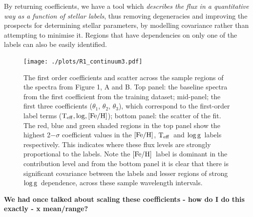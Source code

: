 \documentclass[12pt, preprint]{aastex}
\newcommand{\teff}{\mbox{$\rm T_{eff}$}}
\newcommand{\feh}{\mbox{$\rm [Fe/H]$}}
\newcommand{\logg}{\mbox{$\rm \log g$}}
\begin{document}

By returning coefficients, we have a tool which \textit{describes the flux in a quantitative way as a function of stellar labels}, thus removing degeneracies and improving the prospects for determining stellar parameters, by modelling covariance rather than attempting to minimise it. Regions that have dependencies on only one of the labels can also be easily identified. 

\begin{figure}[h!]
\centering
    \texttt{[image: ./plots/R1\_continuum3.pdf]}
  \caption{The first order coefficients and scatter across the sample regions of the spectra from Figure 1, A and B. Top panel: the baseline spectra from the first coefficient from the training dataset; mid-panel; the first three coefficients ($\theta_1$, $\theta_2$, $\theta_3$),  which correspond to the first-order label terms ($\teff, \log, \feh$); bottom panel: the scatter of the fit.  The red, blue and green shaded regions in the top panel show the highest 2$-\sigma$ coefficient values in the \feh, \teff\ and \logg\ labels respectively. This indicates where these flux levels are strongly proportional to the labels. Note the \feh\ label is dominant in the contribution level and from the bottom panel it is clear that there is significant covariance between the labels and lesser regions of strong \logg\ dependence, across these sample wavelength intervals.}
\label{fig:coeffs}
\end{figure}
\textbf{We had once talked about scaling these coefficients - how do I do this exactly - x mean/range?}

\end{document}
